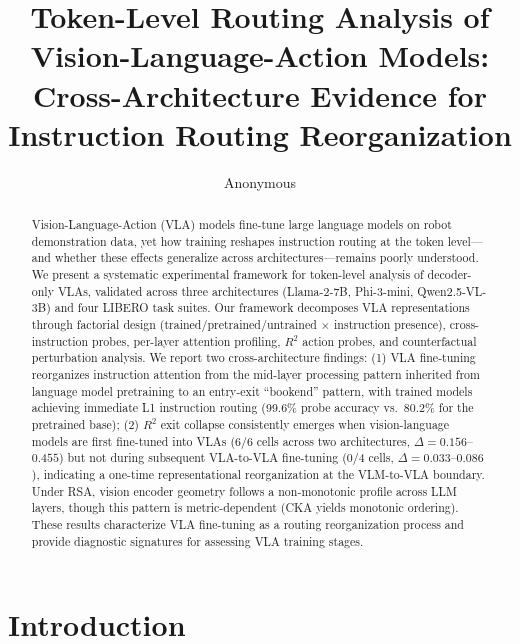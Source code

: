 \documentclass[10pt,letterpaper]{article}
\title{Token-Level Routing Analysis of Vision-Language-Action Models:\\Cross-Architecture Evidence for Instruction Routing Reorganization}
\author{Anonymous}
\date{}
\begin{document}
\maketitle

\begin{abstract}
Vision-Language-Action (VLA) models fine-tune large language models on robot demonstration data, yet how training reshapes instruction routing at the token level---and whether these effects generalize across architectures---remains poorly understood.
We present a systematic experimental framework for token-level analysis of decoder-only VLAs, validated across three architectures (Llama-2-7B, Phi-3-mini, Qwen2.5-VL-3B) and four LIBERO task suites.
Our framework decomposes VLA representations through factorial design (trained/pretrained/untrained $\times$ instruction presence), cross-instruction probes, per-layer attention profiling, $R^2$ action probes, and counterfactual perturbation analysis.
We report two cross-architecture findings:
(1) VLA fine-tuning reorganizes instruction attention from the mid-layer processing pattern inherited from language model pretraining to an entry-exit ``bookend'' pattern, with trained models achieving immediate L1 instruction routing (99.6\% probe accuracy vs.\ 80.2\% for the pretrained base);
(2) $R^2$ exit collapse consistently emerges when vision-language models are first fine-tuned into VLAs (6/6 cells across two architectures, $\Delta = 0.156$--$0.455$) but not during subsequent VLA-to-VLA fine-tuning (0/4 cells, $\Delta = 0.033$--$0.086$), indicating a one-time representational reorganization at the VLM-to-VLA boundary.
Under RSA, vision encoder geometry follows a non-monotonic profile across LLM layers, though this pattern is metric-dependent (CKA yields monotonic ordering).
These results characterize VLA fine-tuning as a routing reorganization process and provide diagnostic signatures for assessing VLA training stages.
\end{abstract}

\section{Introduction}
\label{sec:intro}
\end{document}
